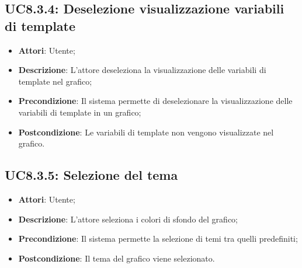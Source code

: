 \subsection{UC8.3.4: Deselezione visualizzazione variabili di template}
\hypertarget{UC8.3.4}{}
\begin{itemize}
	\item \textbf{Attori}: Utente;
	\item \textbf{Descrizione}: L'attore deseleziona la visualizzazione delle variabili di template nel grafico;
	\item \textbf{Precondizione}: Il sistema permette di deselezionare la visualizzazione delle variabili di template in un grafico;
	\item \textbf{Postcondizione}: Le variabili di template non vengono visualizzate nel grafico.
\end{itemize}

\subsection{UC8.3.5: Selezione del tema}
\hypertarget{UC8.3.5}{}
\begin{itemize}
	\item \textbf{Attori}: Utente;
	\item \textbf{Descrizione}: L'attore seleziona i colori di sfondo del grafico; 
	\item \textbf{Precondizione}: Il sistema permette la selezione di temi tra quelli predefiniti;
	\item \textbf{Postcondizione}: Il tema del grafico viene selezionato.
\end{itemize}

